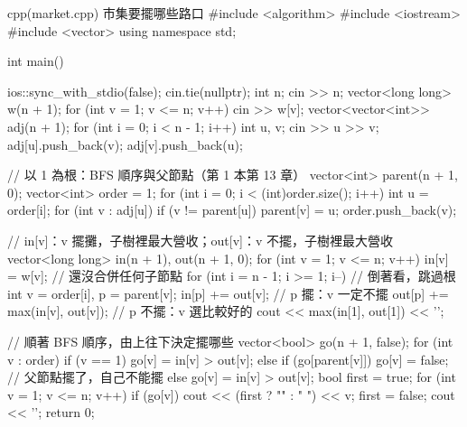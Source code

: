 \begin{example}[label=ex:tdp-mis]{cpp}{(market.cpp) 市集要擺哪些路口}
#include <algorithm>
#include <iostream>
#include <vector>
using namespace std;

int main() {
    ios::sync_with_stdio(false);
    cin.tie(nullptr);
    int n;
    cin >> n;
    vector<long long> w(n + 1);
    for (int v = 1; v <= n; v++) {
        cin >> w[v];
    }
    vector<vector<int>> adj(n + 1);
    for (int i = 0; i < n - 1; i++) {
        int u, v;
        cin >> u >> v;
        adj[u].push_back(v);
        adj[v].push_back(u);
    }

    // 以 1 為根：BFS 順序與父節點（第 1 本第 13 章）
    vector<int> parent(n + 1, 0);
    vector<int> order = {1};
    for (int i = 0; i < (int)order.size(); i++) {
        int u = order[i];
        for (int v : adj[u]) {
            if (v != parent[u]) {
                parent[v] = u;
                order.push_back(v);
            }
        }
    }

    // in[v]：v 擺攤，子樹裡最大營收；out[v]：v 不擺，子樹裡最大營收
    vector<long long> in(n + 1), out(n + 1, 0);
    for (int v = 1; v <= n; v++) {
        in[v] = w[v];                       // 還沒合併任何子節點
    }
    for (int i = n - 1; i >= 1; i--) {      // 倒著看，跳過根
        int v = order[i], p = parent[v];
        in[p] += out[v];                    // p 擺：v 一定不擺
        out[p] += max(in[v], out[v]);       // p 不擺：v 選比較好的
    }
    cout << max(in[1], out[1]) << '\n';

    // 順著 BFS 順序，由上往下決定擺哪些
    vector<bool> go(n + 1, false);
    for (int v : order) {
        if (v == 1) {
            go[v] = in[v] > out[v];
        } else if (go[parent[v]]) {
            go[v] = false;                  // 父節點擺了，自己不能擺
        } else {
            go[v] = in[v] > out[v];
        }
    }
    bool first = true;
    for (int v = 1; v <= n; v++) {
        if (go[v]) {
            cout << (first ? "" : " ") << v;
            first = false;
        }
    }
    cout << '\n';
    return 0;
}
\end{example}


